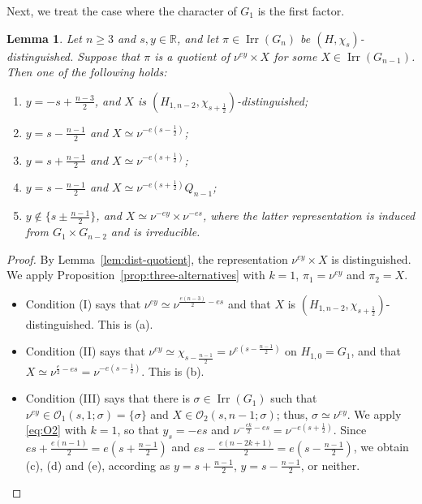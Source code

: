 \documentclass[11pt]{amsart}
\numberwithin{equation}{section}
\theoremstyle{plain}
\newtheorem{lemma}[theorem]{Lemma}
\theoremstyle{definition}
\theoremstyle{remark}
\newcommand{\R}{\mathbb{R}}
\DeclareMathOperator{\Irr}{Irr}
\begin{document}
Next, we treat the case where the character of $G_1$ is the first factor.

\begin{lemma}\label{lem:quot-nu-X}
	Let $n\ge3$ and $s,y\in\R$, and let $\pi\in\Irr(G_n)$ be $(H,\chi_s)$-distinguished. Suppose that $\pi$ is a quotient of $\nu^{ey}\times X$ for some $X\in\Irr(G_{n-1})$. Then one of the following holds:
	\begin{enumerate}[label=\textup{(\alph*)}]
		\item $y=-s+\frac{n-3}2$, and $X$ is $(H_{1,n-2},\chi_{s+\frac12})$-distinguished;
		\item $y=s-\frac{n-1}2$ and $X\simeq\nu^{-e(s-\frac12)}$;
		\item $y=s+\frac{n-1}2$ and $X\simeq\nu^{-e(s+\frac12)}$;
		\item $y=s-\frac{n-1}2$ and $X\simeq\nu^{-e(s+\frac12)}Q_{n-1}$;
		\item $y\notin\{s\pm\frac{n-1}2\}$, and $X\simeq\nu^{-ey}\times\nu^{-es}$, where the latter representation is induced from $G_1\times G_{n-2}$ and is irreducible.
	\end{enumerate}
\end{lemma}

\begin{proof}
	By Lemma~\ref{lem:dist-quotient}, the representation $\nu^{ey}\times X$ is distinguished. We apply Proposition~\ref{prop:three-alternatives} with $k=1$, $\pi_1=\nu^{ey}$ and $\pi_2=X$.
	\begin{itemize}
		\item Condition (I) says that $\nu^{ey}\simeq\nu^{\frac{e(n-3)}2-es}$ and that $X$ is $(H_{1,n-2},\chi_{s+\frac12})$-distinguished. This is (a).
		\item Condition (II) says that $\nu^{ey}\simeq\chi_{s-\frac{n-1}2}=\nu^{e(s-\frac{n-1}2)}$ on $H_{1,0}=G_1$, and that $X\simeq\nu^{\frac e2-es}=\nu^{-e(s-\frac12)}$. This is (b).
		\item Condition (III) says that there is $\sigma\in\Irr(G_1)$ such that $\nu^{ey}\in\mathcal O_1(s,1;\sigma)=\{\sigma\}$ and $X\in\mathcal O_2(s,n-1;\sigma)$; thus, $\sigma\simeq\nu^{ey}$. We apply \eqref{eq:O2} with $k=1$, so that $y_s=-es$ and $\nu^{-\frac{ek}2-es}=\nu^{-e(s+\frac12)}$. Since $es+\frac{e(n-1)}2=e(s+\frac{n-1}2)$ and $es-\frac{e(n-2k+1)}2=e(s-\frac{n-1}2)$, we obtain (c), (d) and (e), according as $y=s+\frac{n-1}2$, $y=s-\frac{n-1}2$, or neither.\qedhere
	\end{itemize}
\end{proof}
\end{document}
